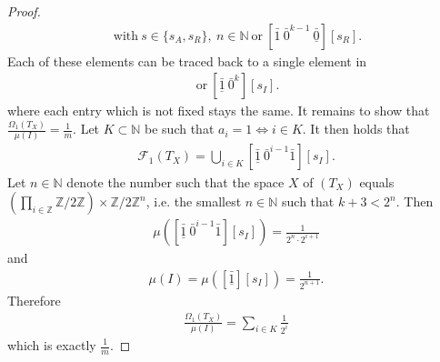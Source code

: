 \documentclass[12pt,a4paper]{scrartcl}
\theoremstyle{plain}
\theoremstyle{definition}
\numberwithin{equation}{section}
\newcommand{\Z}{\mathbb{Z}} %
\newcommand{\N}{\mathbb{N}} %
\newcommand{\2}{\mathbb{Z} / 2 \mathbb{Z}}
\newcommand{\1}{\bar{1}}
\newcommand{\0}{\bar{0}}
\begin{document}
\begin{proof}
	\begin{align*}
		[\1 \ \0^n \ \underline{\1}][s] \ \text{with} \ s \in \{s_A, s_R\}, \ n \in \N \ \text{or} \ [\1 \ \0^{k-1} \ \underline{\0}][s_R].
	\end{align*} 
	Each of these elements can be traced back to a single element in
	\begin{align*}
	[\underline{\1} \ \0^{n} \ \1][s_I] \ \text{or} \ [\underline{\1}  \ \0^{k}][s_I].
	\end{align*} 
	where each entry which is not fixed stays the same. 
	It remains to show that $\frac{\Omega_1(T_X)}{\mu(I)} = \frac{1}{m}$. Let $K \subset \N$ be such that $a_i = 1 \Leftrightarrow i \in K$. It then holds that
	\begin{align*}
		\mathcal{F}_1(T_X) = \bigcup_{i \in K}[\underline{\1} \ \0^{i-1} \1][s_I].
	\end{align*}
	Let $n \in \N$ denote the number such that the space $X$ of $(T_X)$ equals $(\prod_{i \in \Z} \2) \times \2^n$, i.e. the smallest $n \in \N$ such that $k+3 < 2^n$. Then 
	\begin{align*}
		\mu([\underline{\1} \ \0^{i-1} \1][s_I]) = \frac{1}{2^n \cdot 2^ {i + 1}}
	\end{align*}
	and
	\begin{align*}
		\mu(I) = \mu([\underline{\1}][s_I]) = \frac{1}{2^{n + 1}}.
	\end{align*}
	Therefore 
	\begin{align*}
		\frac{\Omega_1(T_X)}{\mu(I)} = \sum_{i \in K} \frac{1}{2^i}
	\end{align*}
	which is exactly $\frac{1}{m}$.
\end{proof}
\end{document}
